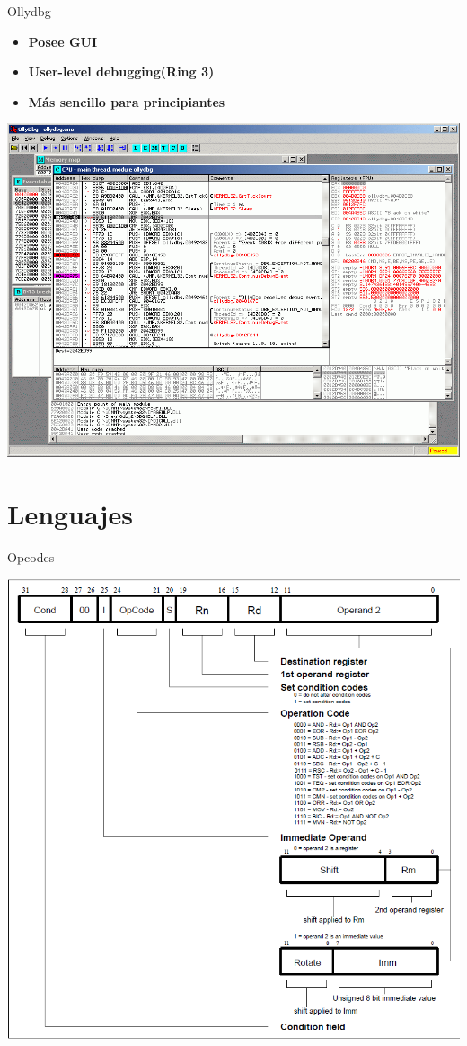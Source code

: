 \documentclass{beamer}
\begin{document}
\begin{frame}{Ollydbg}

\begin{itemize}
	\item \textbf{Posee GUI}
	\item \textbf{User-level debugging(Ring 3)} 
	\item \textbf{Más sencillo para principiantes}
\end{itemize}
\includegraphics[scale=0.25]{OllyDbg2.png}
\end{frame}

\section{Lenguajes}

\begin{frame}{Opcodes}

\begin{center}
\includegraphics[scale=0.3]{0cPOx.png}
\end{center}

\end{frame}
\end{document}
